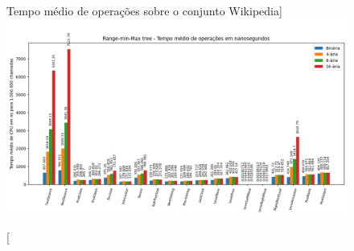 \begin{landscape}
\begin{figure}[!ht]
    \centering
      \caption[Operações sobre o conjunto de dado wikipedia][Tempo médio de operações sobre o conjunto Wikipedia]{
          \includegraphics[scale=0.8]{images/wiki_i1000000.png}
        }
\end{figure}
\end{landscape}
